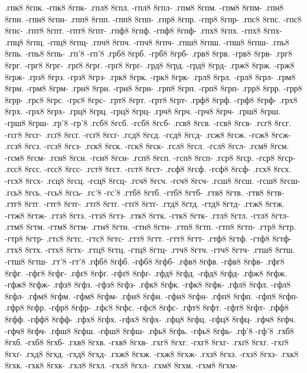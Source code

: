 {.гпк8 8гпк. -гпк8 8гпк-
.гпл8 8гпл. -гпл8 8гпл-
.гпм8 8гпм. -гпм8 8гпм-
.гпн8 8гпн. -гпн8 8гпн-
.гпп8 8гпп. -гпп8 8гпп-
.гпр8 8гпр. -гпр8 8гпр-
.гпс8 8гпс. -гпс8 8гпс-
.гпт8 8гпт. -гпт8 8гпт-
.гпф8 8гпф. -гпф8 8гпф-
.гпх8 8гпх. -гпх8 8гпх-
.гпц8 8гпц. -гпц8 8гпц-
.гпч8 8гпч. -гпч8 8гпч-
.гпш8 8гпш. -гпш8 8гпш-
.гпь8 8гпь. -гпь8 8гпь-
.гп'8 -гп'8
.грб8 8грб. -грб8 8грб-
.грв8 8грв. -грв8 8грв-
.грг8 8грг. -грг8 8грг-
.грґ8 8грґ. -грґ8 8грґ-
.грд8 8грд. -грд8 8грд-
.грж8 8грж. -грж8 8грж-
.грз8 8грз. -грз8 8грз-
.грк8 8грк. -грк8 8грк-
.грл8 8грл. -грл8 8грл-
.грм8 8грм. -грм8 8грм-
.грн8 8грн. -грн8 8грн-
.грп8 8грп. -грп8 8грп-
.грр8 8грр. -грр8 8грр-
.грс8 8грс. -грс8 8грс-
.грт8 8грт. -грт8 8грт-
.грф8 8грф. -грф8 8грф-
.грх8 8грх. -грх8 8грх-
.грц8 8грц. -грц8 8грц-
.грч8 8грч. -грч8 8грч-
.грш8 8грш. -грш8 8грш-
.гр'8 -гр'8
.гсб8 8гсб. -гсб8 8гсб-
.гсв8 8гсв. -гсв8 8гсв-
.гсг8 8гсг. -гсг8 8гсг-
.гсґ8 8гсґ. -гсґ8 8гсґ-
.гсд8 8гсд. -гсд8 8гсд-
.гсж8 8гсж. -гсж8 8гсж-
.гсз8 8гсз. -гсз8 8гсз-
.гск8 8гск. -гск8 8гск-
.гсл8 8гсл. -гсл8 8гсл-
.гсм8 8гсм. -гсм8 8гсм-
.гсн8 8гсн. -гсн8 8гсн-
.гсп8 8гсп. -гсп8 8гсп-
.гср8 8гср. -гср8 8гср-
.гсс8 8гсс. -гсс8 8гсс-
.гст8 8гст. -гст8 8гст-
.гсф8 8гсф. -гсф8 8гсф-
.гсх8 8гсх. -гсх8 8гсх-
.гсц8 8гсц. -гсц8 8гсц-
.гсч8 8гсч. -гсч8 8гсч-
.гсш8 8гсш. -гсш8 8гсш-
.гсь8 8гсь. -гсь8 8гсь-
.гс'8 -гс'8
.гтб8 8гтб. -гтб8 8гтб-
.гтв8 8гтв. -гтв8 8гтв-
.гтг8 8гтг. -гтг8 8гтг-
.гтґ8 8гтґ. -гтґ8 8гтґ-
.гтд8 8гтд. -гтд8 8гтд-
.гтж8 8гтж. -гтж8 8гтж-
.гтз8 8гтз. -гтз8 8гтз-
.гтк8 8гтк. -гтк8 8гтк-
.гтл8 8гтл. -гтл8 8гтл-
.гтм8 8гтм. -гтм8 8гтм-
.гтн8 8гтн. -гтн8 8гтн-
.гтп8 8гтп. -гтп8 8гтп-
.гтр8 8гтр. -гтр8 8гтр-
.гтс8 8гтс. -гтс8 8гтс-
.гтт8 8гтт. -гтт8 8гтт-
.гтф8 8гтф. -гтф8 8гтф-
.гтх8 8гтх. -гтх8 8гтх-
.гтц8 8гтц. -гтц8 8гтц-
.гтч8 8гтч. -гтч8 8гтч-
.гтш8 8гтш. -гтш8 8гтш-
.гт'8 -гт'8
.гфб8 8гфб. -гфб8 8гфб-
.гфв8 8гфв. -гфв8 8гфв-
.гфг8 8гфг. -гфг8 8гфг-
.гфґ8 8гфґ. -гфґ8 8гфґ-
.гфд8 8гфд. -гфд8 8гфд-
.гфж8 8гфж. -гфж8 8гфж-
.гфз8 8гфз. -гфз8 8гфз-
.гфк8 8гфк. -гфк8 8гфк-
.гфл8 8гфл. -гфл8 8гфл-
.гфм8 8гфм. -гфм8 8гфм-
.гфн8 8гфн. -гфн8 8гфн-
.гфп8 8гфп. -гфп8 8гфп-
.гфр8 8гфр. -гфр8 8гфр-
.гфс8 8гфс. -гфс8 8гфс-
.гфт8 8гфт. -гфт8 8гфт-
.гфф8 8гфф. -гфф8 8гфф-
.гфх8 8гфх. -гфх8 8гфх-
.гфц8 8гфц. -гфц8 8гфц-
.гфч8 8гфч. -гфч8 8гфч-
.гфш8 8гфш. -гфш8 8гфш-
.гфь8 8гфь. -гфь8 8гфь-
.гф'8 -гф'8
.гхб8 8гхб. -гхб8 8гхб-
.гхв8 8гхв. -гхв8 8гхв-
.гхг8 8гхг. -гхг8 8гхг-
.гхґ8 8гхґ. -гхґ8 8гхґ-
.гхд8 8гхд. -гхд8 8гхд-
.гхж8 8гхж. -гхж8 8гхж-
.гхз8 8гхз. -гхз8 8гхз-
.гхк8 8гхк. -гхк8 8гхк-
.гхл8 8гхл. -гхл8 8гхл-
.гхм8 8гхм. -гхм8 8гхм-
}
